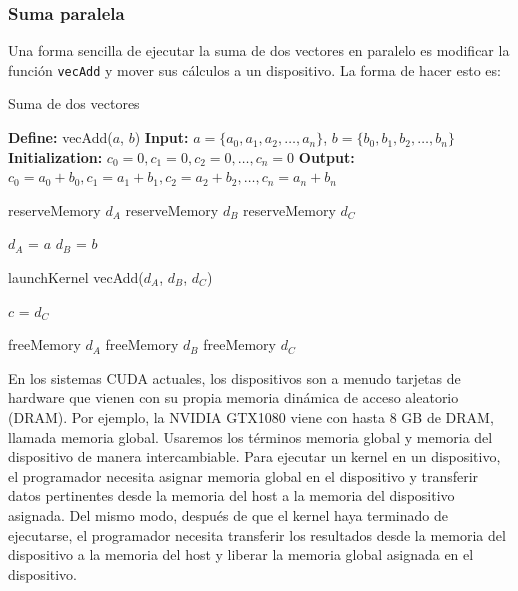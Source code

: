 \subsubsection{Suma paralela}

Una forma sencilla de ejecutar la suma de dos vectores en paralelo es modificar la función \texttt{vecAdd} y mover sus
cálculos a un dispositivo. La forma de hacer esto es:

\begin{algorithm}
\caption{Suma de dos vectores}
  \begin{algorithmic}[1]
  \Statex \textbf{Define:} vecAdd($a$, $b$)
  \Statex \textbf{Input:} $a = \{a_0, a_1, a_2, \ldots, a_n\}$, $b = \{b_0, b_1, b_2, \ldots, b_n\}$
  \Statex \textbf{Initialization:} $c_0 = 0, c_1 = 0, c_2 = 0, \ldots, c_n = 0$
  \Statex \textbf{Output:} $c_0 = a_0 + b_0, c_1 = a_1 + b_1, c_2 = a_2 + b_2, \ldots, c_n = a_n + b_n$

  \Statex reserveMemory $d_A$
  \Statex reserveMemory $d_B$
  \Statex reserveMemory $d_C$

  \Statex $d_A$ = $a$
  \Statex $d_B$ = $b$

  \Statex launchKernel vecAdd($d_A$, $d_B$, $d_C$)

  \Statex $c$ = $d_C$

  \Statex freeMemory $d_A$
  \Statex freeMemory $d_B$
  \Statex freeMemory $d_C$
\end{algorithmic}
\end{algorithm}

En los sistemas CUDA actuales, los dispositivos son a menudo tarjetas de hardware que vienen con su propia memoria
dinámica de acceso aleatorio (DRAM). Por ejemplo, la NVIDIA GTX1080 viene con hasta 8 GB de DRAM, llamada memoria
global. Usaremos los términos memoria global y memoria del dispositivo de manera intercambiable. Para ejecutar un kernel
en un dispositivo, el programador necesita asignar memoria global en el dispositivo y transferir datos pertinentes desde
la memoria del host a la memoria del dispositivo asignada. Del mismo modo, después de que el kernel haya terminado de
ejecutarse, el programador necesita transferir los resultados desde la memoria del dispositivo a la memoria del host y
liberar la memoria global asignada en el dispositivo.

